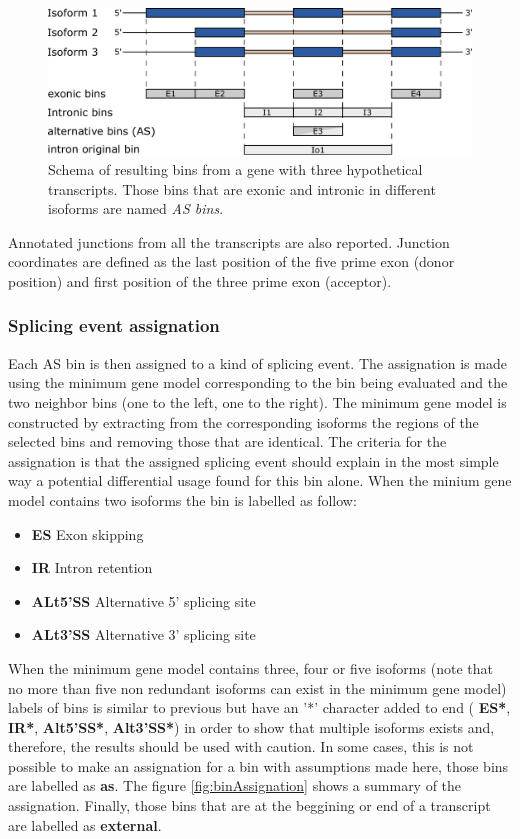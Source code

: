 \documentclass{article}
\begin{document}
\begin{figure}[ht!]
\centering
\includegraphics[width=12cm]{images/binDefinition.pdf}
\caption{ Schema of resulting bins from a gene with three hypothetical
  transcripts. Those bins that are exonic and intronic in different isoforms are 
  named \textit{AS bins}.
}
\label{fig:binDefinition}
\end{figure}

Annotated junctions from all the transcripts are also reported. Junction 
coordinates are defined as the last position of the five prime exon (donor 
position) and first position of the three prime exon (acceptor).

\subsubsection{Splicing event assignation} \label{sec:eventAssign}
Each AS bin is then assigned to a kind of splicing event. The assignation is
made using the minimum gene model corresponding to the bin being evaluated and
the two neighbor bins (one to the left, one to the right). The minimum gene
model is constructed by extracting from the corresponding isoforms the
regions of the selected bins and removing those that are identical. The criteria
for the assignation is that the assigned splicing event should explain in the
most simple way a potential differential usage found for this bin alone. When
the minium gene model contains two isoforms the bin is labelled as follow:

\begin{itemize}
  \item \textbf {ES} Exon skipping
  \item \textbf {IR} Intron retention
  \item \textbf {ALt5'SS} Alternative 5' splicing site
  \item \textbf {ALt3'SS} Alternative 3' splicing site
\end{itemize}

When the minimum gene model contains three, four or five isoforms (note that no
more than five non redundant isoforms can exist in the minimum gene model)
labels of bins is similar to previous but have an '*' character added to end
( \textbf{ES*}, \textbf{IR*}, \textbf{Alt5'SS*}, \textbf{Alt3'SS*}) in order to
show that multiple isoforms exists and, therefore, the results should be used
with caution. In some cases, this is not possible to make an assignation for a
bin with assumptions made here, those bins are labelled as \textbf{as}. The
figure \ref{fig:binAssignation} shows a summary of the assignation.
Finally, those bins that are at the beggining or end of a transcript are
labelled as \textbf{external}.
\end{document}
